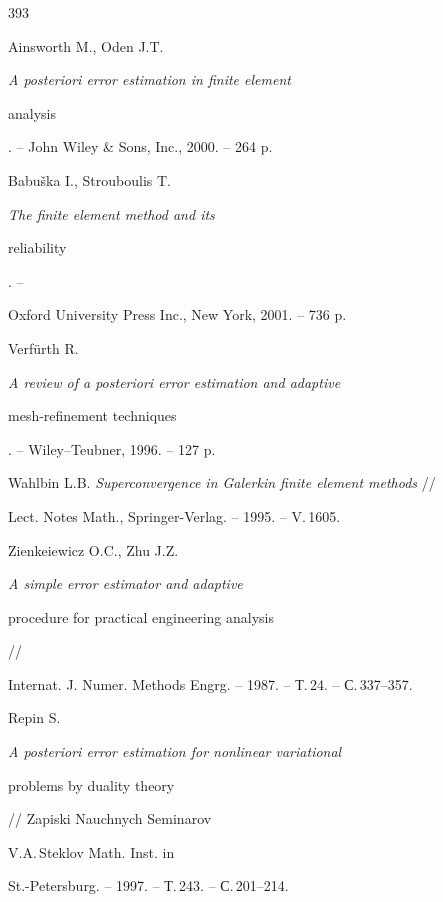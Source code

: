 \begin{thebibliography}{393}







Ainsworth M., Oden J.T. {\em A posteriori error estimation in finite element 


analysis}. -- John Wiley \& Sons, Inc., 2000. -- 264 p.







Babu\v ska I., Strouboulis T. {\em The finite element method and its


reliability}. --


Oxford University Press Inc., New York, 2001. -- 736 p.







Verf\"urth R. {\em A review of a posteriori error estimation and adaptive


mesh-refinement techniques}. -- Wiley--Teubner, 1996. -- 127 p. %







Wahlbin L.B. {\em Superconvergence in Galerkin finite element methods} //


Lect. Notes Math., Springer-Verlag. -- 1995. -- V.\,1605.







Zienkeiewicz O.C., Zhu J.Z. {\em A simple error estimator and adaptive 


procedure for practical engineering analysis} //


Internat. J. Numer. Methods Engrg. -- 1987. -- Т.\,24. -- С.\,337--357.







Repin S. {\em A posteriori error estimation for nonlinear variational


problems by duality theory} // Zapiski Nauchnych Seminarov


V.A.\,Steklov Math. Inst. in


St.-Petersburg. -- 1997. -- Т.\,243. -- С.\,201--214.






\end{thebibliography}
